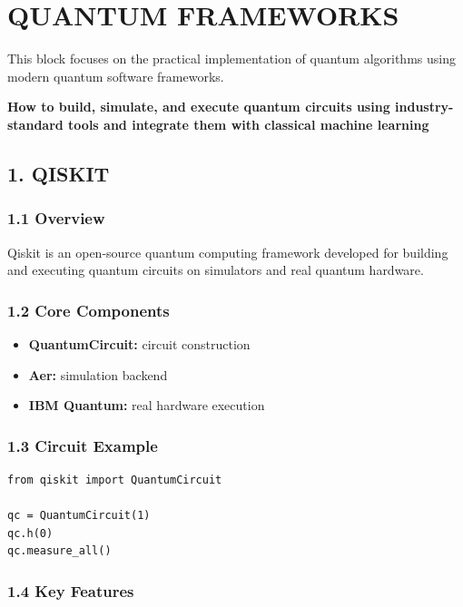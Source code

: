 \chapter{QUANTUM FRAMEWORKS}

This block focuses on the practical implementation of quantum algorithms using modern quantum software frameworks.

\begin{center}
\textbf{How to build, simulate, and execute quantum circuits using industry-standard tools and integrate them with classical machine learning}
\end{center}

\vspace{0.5cm}

\section*{1. QISKIT}

\subsection*{1.1 Overview}

Qiskit is an open-source quantum computing framework developed for building and executing quantum circuits on simulators and real quantum hardware.

\subsection*{1.2 Core Components}

\begin{itemize}
\item \textbf{QuantumCircuit:} circuit construction
\item \textbf{Aer:} simulation backend
\item \textbf{IBM Quantum:} real hardware execution
\end{itemize}

\subsection*{1.3 Circuit Example}

\begin{verbatim}
from qiskit import QuantumCircuit

qc = QuantumCircuit(1)
qc.h(0)
qc.measure_all()
\end{verbatim}

\subsection*{1.4 Key Features}

